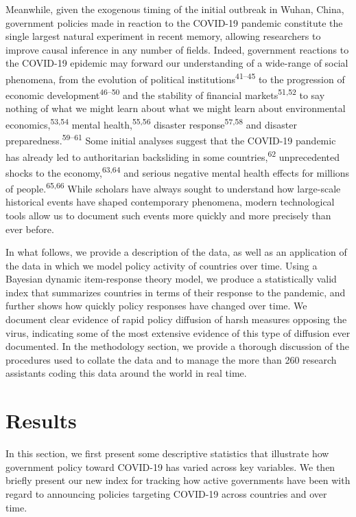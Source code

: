 \documentclass[
]{article}
\begin{document}
Meanwhile, given the exogenous timing of the initial outbreak in Wuhan, China, government policies made in reaction to the COVID-19 pandemic constitute the single largest natural experiment in recent memory, allowing researchers to improve causal inference in any number of fields. Indeed, government reactions to the COVID-19 epidemic may forward our understanding of a wide-range of social phenomena, from the evolution of political institutions\textsuperscript{41--45} to the progression of economic development\textsuperscript{46--50} and the stability of financial markets\textsuperscript{51,52} to say nothing of what we might learn about what we might learn about environmental economics,\textsuperscript{53,54} mental health,\textsuperscript{55,56} disaster response\textsuperscript{57,58} and disaster preparedness.\textsuperscript{59--61} Some initial analyses suggest that the COVID-19 pandemic has already led to authoritarian backsliding in some countries,\textsuperscript{62} unprecedented shocks to the economy,\textsuperscript{63,64} and serious negative mental health effects for millions of people.\textsuperscript{65,66} While scholars have always sought to understand how large-scale historical events have shaped contemporary phenomena, modern technological tools allow us to document such events more quickly and more precisely than ever before.

In what follows, we provide a description of the data, as well as an application of the data in which we model policy activity of countries over time. Using a Bayesian dynamic item-response theory model, we produce a statistically valid index that summarizes countries in terms of their response to the pandemic, and further shows how quickly policy responses have changed over time. We document clear evidence of rapid policy diffusion of harsh measures opposing the virus, indicating some of the most extensive evidence of this type of diffusion ever documented. In the methodology section, we provide a thorough discussion of the procedures used to collate the data and to manage the more than 260 research assistants coding this data around the world in real time.

\hypertarget{results}{%
\section*{Results}\label{results}}

In this section, we first present some descriptive statistics that illustrate how government policy toward COVID-19 has varied across key variables. We then briefly present our new index for tracking how active governments have been with regard to announcing policies targeting COVID-19 across countries and over time.
\end{document}
